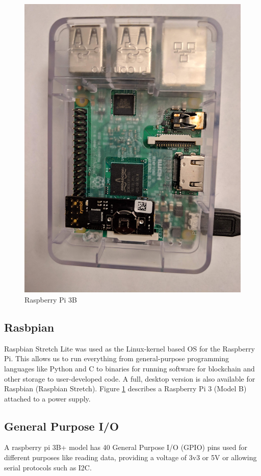 \documentclass[11pt,openright]{report}
\begin{document}
\begin{figure}
    \centering
    \includegraphics[scale=0.1]{images/rpi.jpg}
    \caption{Raspberry Pi 3B}
    \label{fig:rpi}
\end{figure}


\newpage
\subsection{Rasbpian}
Raspbian Stretch Lite was used as the Linux-kernel based OS for the Raspberry Pi. This allows us to run everything from general-purpose programming languages like Python and C to binaries for running software for blockchain and other storage to user-developed code. A full, desktop version is also available for Raspbian (Raspbian Stretch). Figure \ref{fig:rpi} describes a Raspberry Pi 3 (Model B) attached to a power supply.
 
\subsection{General Purpose I/O}
A raspberry pi 3B+ model has 40 General Purpose I/O (GPIO) pins used for different purposes like reading data, providing a voltage of 3v3 or 5V or allowing serial protocols such as I2C.
\end{document}
